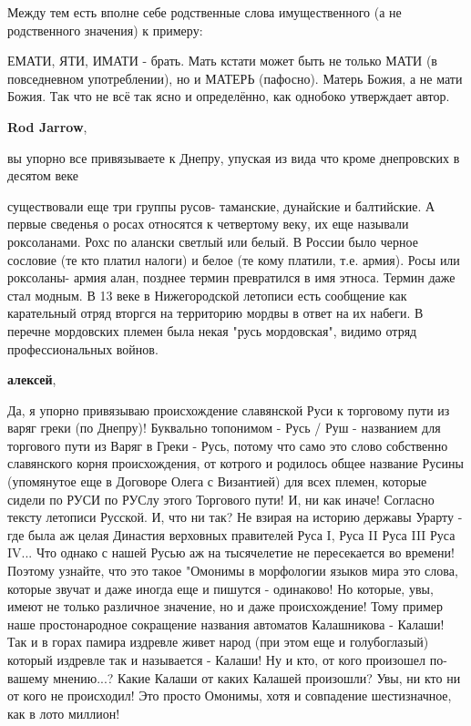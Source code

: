 \begin{itemize}
\begin{itemize}
Между тем есть вполне себе родственные слова имущественного (а не родственного
значения) к примеру:

ЕМАТИ, ЯТИ, ИМАТИ - брать. Мать кстати может быть не только МАТИ (в
повседневном употреблении), но и МАТЕРЬ (пафосно). Матерь Божия, а не мати
Божия. Так что не всё так ясно и определённо, как однобоко утверждает автор.

\textbf{Rod Jarrow}, 

вы упорно все привязываете к Днепру, упуская из вида что кроме днепровских в
десятом веке

существовали еще три группы русов- таманские, дунайские и балтийские. А первые
сведенья о росах относятся к четвертому веку, их еще называли роксоланами. Рохс
по алански светлый или белый. В России было черное сословие (те кто платил
налоги) и белое (те кому платили, т.е. армия). Росы или роксоланы- армия алан,
позднее термин превратился в имя этноса. Термин даже стал модным. В 13 веке в
Нижегородской летописи есть сообщение как карательный отряд вторгся на
территорию мордвы в ответ на их набеги. В перечне мордовских племен была некая
"русь мордовская", видимо отряд профессиональных войнов.

\textbf{алексей}, 

Да, я упорно привязываю происхождение славянской Руси к торговому пути из варяг
греки (по Днепру)! Буквально топонимом - Русь / Руш - названием для торгового
пути из Варяг в Греки - Русь, потому что само это слово собственно славянского
корня происхождения, от котрого и родилось общее название Русины (упомянутое
еще в Договоре Олега с Византией) для всех племен, которые сидели по РУСИ по
РУСлу этого Торгового пути! И, ни как иначе! Согласно тексту летописи Русской.
И, что ни так? Не взирая на историю державы Урарту - где была аж целая Династия
верховных правителей Руса I, Руса II Руса III Руса IV... Что однако с нашей
Русью аж на тысячелетие не пересекается во времени! Поэтому узнайте, что это
такое "Омонимы в морфологии языков мира это слова, которые звучат и даже иногда
еще и пишутся - одинаково! Но которые, увы, имеют не только различное значение,
но и даже происхождение! Тому пример наше простонародное сокращение названия
автоматов Калашникова - Калаши! Так и в горах памира издревле живет народ (при
этом еще и голубоглазый) который издревле так и называется - Калаши! Ну и кто,
от кого произошел по-вашему мнению...? Какие Калаши от каких Калашей произошли?
Увы, ни кто ни от кого не происходил! Это просто Омонимы, хотя и совпадение
шестизначное, как в лото миллион!


\end{itemize}
\end{itemize}
